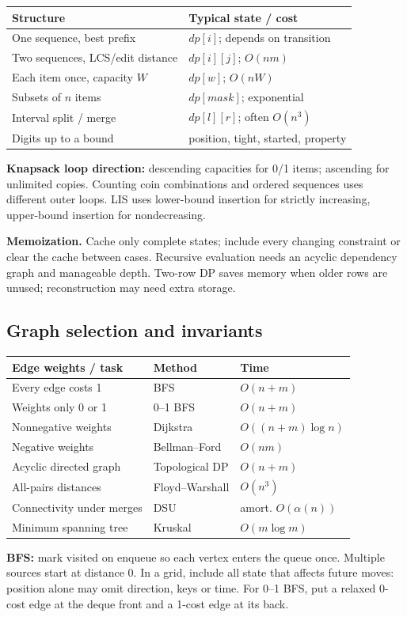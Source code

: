 \begin{tabularx}{\linewidth}{@{}XX@{}}
\toprule
Structure & Typical state / cost\\
\midrule
One sequence, best prefix & $dp[i]$; depends on transition\\
Two sequences, LCS/edit distance & $dp[i][j]$; $O(nm)$\\
Each item once, capacity $W$ & $dp[w]$; $O(nW)$\\
Subsets of $n$ items & $dp[mask]$; exponential\\
Interval split / merge & $dp[l][r]$; often $O(n^3)$\\
Digits up to a bound & position, tight, started, property\\
\bottomrule
\end{tabularx}
\textbf{Knapsack loop direction:} descending capacities for 0/1 items;
ascending for unlimited copies. Counting coin combinations and ordered
sequences uses different outer loops. LIS uses lower-bound insertion
for strictly increasing, upper-bound insertion for nondecreasing.

\textbf{Memoization.} Cache only complete states; include every changing
constraint or clear the cache between cases. Recursive evaluation needs
an acyclic dependency graph and manageable depth. Two-row DP saves
memory when older rows are unused; reconstruction may need extra storage.

\subsection{Graph selection and invariants}\label{algo:graphs}
\begin{tabularx}{\linewidth}{@{}Xll@{}}
\toprule
Edge weights / task & Method & Time\\
\midrule
Every edge costs 1 & BFS & $O(n+m)$\\
Weights only 0 or 1 & 0--1 BFS & $O(n+m)$\\
Nonnegative weights & Dijkstra & $O((n+m)\log n)$\\
Negative weights & Bellman--Ford & $O(nm)$\\
Acyclic directed graph & Topological DP & $O(n+m)$\\
All-pairs distances & Floyd--Warshall & $O(n^3)$\\
Connectivity under merges & DSU & amort. $O(\alpha(n))$\\
Minimum spanning tree & Kruskal & $O(m\log m)$\\
\bottomrule
\end{tabularx}
\textbf{BFS:} mark visited on enqueue so each vertex enters the queue
once. Multiple sources start at distance 0. In a grid, include all state
that affects future moves: position alone may omit direction, keys or time.
For 0--1 BFS, put a relaxed 0-cost edge at the deque front and a
1-cost edge at its back.

